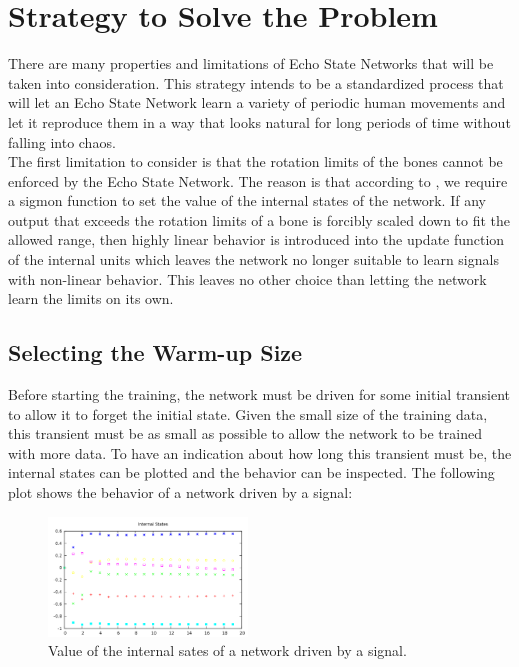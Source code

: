 \documentclass[letterpaper,9pt]{article}
\begin{document}
\section{Strategy to Solve the Problem}

There are many properties and limitations of Echo State Networks that will be taken into consideration. This strategy intends to be a standardized process that will let an Echo State Network learn a variety of periodic human movements and let it reproduce them in a way that looks natural for long periods of time without falling into chaos.\\

The first limitation to consider is that the rotation limits of the bones cannot be enforced by the Echo State Network. The reason is that according to \cite{JaegerESNTutorial}, we require a sigmon function to set the value of the internal states of the network. If any output that exceeds the rotation limits of a bone is forcibly scaled down to fit the allowed range, then highly linear behavior is introduced into the update function of the internal units which leaves the network no longer suitable to learn signals with non-linear behavior. This leaves no other choice than letting the network learn the limits on its own.

\subsection{Selecting the Warm-up Size}

Before starting the training, the network must be driven for some initial transient to allow it to forget the initial state. Given the small size of the training data, this transient must be as small as possible to allow the network to be trained with more data. To have an indication about how long this transient must be, the internal states can be plotted and the behavior can be inspected. The following plot shows the behavior of a network driven by a signal: 

\begin{figure}[h!]
  \centering
    \includegraphics[height=120px]{Extra/walk_initial_states.png}
    \caption[Teacher Forced Internal States]{Value of the internal sates of a network driven by a signal.}
\end{figure}
\end{document}
